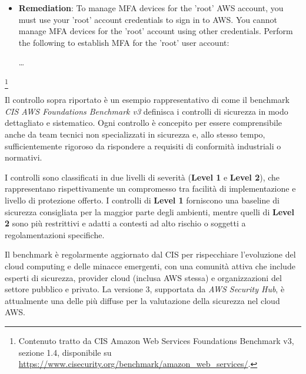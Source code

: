 \begin{mdframed}[backgroundcolor=gray!05, linecolor=gray!50]
\begin{itemize}
        From Command Line:

        \begin{enumerate}
            \item Run the following command:
\begin{lstlisting}[language=bash, xleftmargin=0pt, framexleftmargin=0pt]
aws iam get-account-summary | grep "AccountMFAEnabled"
aws iam get-account-summary | grep "AccountPasswordPresent"
\end{lstlisting}
            \item Ensure the \texttt{AccountMFAEnabled} property is set to 1 or the \texttt{AccountPasswordPresent} property is set to 0.
        \end{enumerate}
        \item \textbf{Remediation}: To manage MFA devices for the 'root' AWS account, you must use your 'root' account credentials to sign in to AWS. You cannot manage MFA devices for the 'root' account using other credentials. Perform the following to establish MFA for the 'root' user account:
        
        \dots

    \end{itemize}
    \end{mdframed}

    \footnote{Contenuto tratto da CIS Amazon Web Services Foundations Benchmark v3, sezione 1.4, disponibile su \url{https://www.cisecurity.org/benchmark/amazon_web_services/}.}

Il controllo sopra riportato è un esempio rappresentativo di come il benchmark \textit{CIS AWS Foundations Benchmark v3} definisca i controlli di sicurezza in modo dettagliato e sistematico. Ogni controllo è concepito per essere comprensibile anche da team tecnici non specializzati in sicurezza e, allo stesso tempo, sufficientemente rigoroso da rispondere a requisiti di conformità industriali o normativi.

I controlli sono classificati in due livelli di severità (\textbf{Level 1} e \textbf{Level 2}), che rappresentano rispettivamente un compromesso tra facilità di implementazione e livello di protezione offerto. I controlli di \textbf{Level 1} forniscono una baseline di sicurezza consigliata per la maggior parte degli ambienti, mentre quelli di \textbf{Level 2} sono più restrittivi e adatti a contesti ad alto rischio o soggetti a regolamentazioni specifiche.

Il benchmark è regolarmente aggiornato dal CIS per rispecchiare l'evoluzione del cloud computing e delle minacce emergenti, con una comunità attiva che include esperti di sicurezza, provider cloud (inclusa AWS stessa) e organizzazioni del settore pubblico e privato. La versione 3, supportata da \textit{AWS Security Hub}, è attualmente una delle più diffuse per la valutazione della sicurezza nel cloud AWS.

